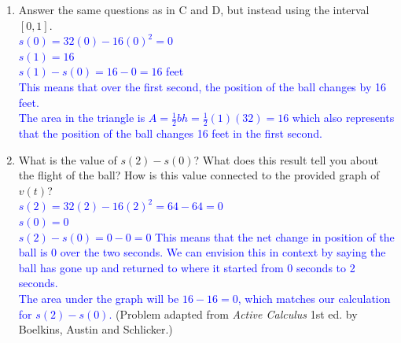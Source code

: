 \documentclass{ximera}
\begin{document}
\begin{exercise}
\begin{enumerate}
        \item[E.] Answer the same questions as in C and D, but instead using the interval $[0,1]$.\\
        \textcolor{blue}{ $s(0)=32(0)-16(0)^2=0$\\
        $s(1)=16$\\
        $s(1)-s(0)=16-0=16$ feet\\
        This means that over the first second, the position of the ball changes by 16 feet.\\
        The area in the triangle is $A=\frac12bh=\frac12(1)(32)=16$ which also represents that the position of the ball changes 16 feet in the first second.}
        
        \item[F.] What is the value of $s(2)-s(0)$?  What does this result tell you about the flight of the ball?  How is this value connected to the provided graph of $v(t)$? \\
        \textcolor{blue}{ $s(2)=32(2)-16(2)^2=64-64=0$\\
        $s(0)=0$\\
        $s(2)-s(0)=0-0=0$ This means that the net change in position of the ball is 0 over the two seconds.  We can envision this in context by saying the ball has gone up and returned to where it started from 0 seconds to 2 seconds. \\
        The area under the graph will be $16-16=0$, which matches our calculation for $s(2)-s(0)$.}
        (Problem adapted from \textit{Active Calculus} 1st ed. by Boelkins, Austin and Schlicker.)
    \end{enumerate}
\end{exercise}
\end{document}
